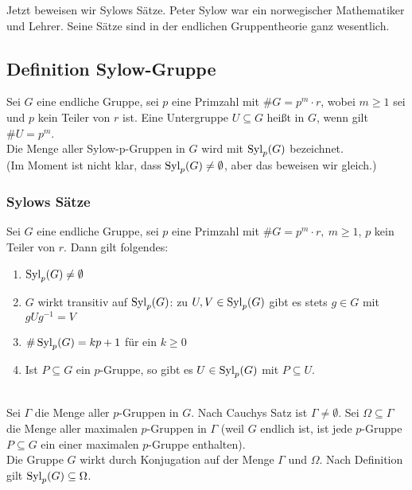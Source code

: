 Jetzt beweisen wir Sylows Sätze. 
Peter Sylow war ein norwegischer Mathematiker und Lehrer. 
Seine Sätze sind in der endlichen Gruppentheorie ganz wesentlich.

\subsection{Definition Sylow-Gruppe}
\label{sub:def_sylow_gruppe}
Sei $G$ eine endliche Gruppe, sei $p$ eine Primzahl mit $\#G=p^m\cdot r$, wobei $m\ge 1$ sei und $p$ kein Teiler von $r$ ist. Eine Untergruppe $U\subseteq G$ heißt  in $G$, wenn gilt $\#U=p^m$.\\
Die Menge aller Sylow-p-Gruppen in $G$ wird mit $\operatorname{Syl}_p(G)$ bezeichnet.\\
(Im Moment ist nicht klar, dass $\operatorname{Syl}_p(G)\not=\emptyset$, aber das beweisen wir gleich.)

\subsubsection*{Sylows Sätze}
\label{ssub:sylows_sätze}
Sei $G$ eine endliche Gruppe, sei $p$ eine Primzahl mit $\#G=p^m\cdot r,~m\ge 1$, $p$ kein Teiler von $r$. 
Dann gilt folgendes:\\
\begin{enumerate}[(1)]
	\item $\operatorname{Syl}_p(G)\not=\emptyset$
	\item $G$ wirkt transitiv auf $\operatorname{Syl}_p(G)$: 
	zu $U,V\in \operatorname{Syl}_p(G)$ gibt es stets $g\in G$ mit $gUg^{-1}=V$
	\item $\#\operatorname{Syl}_p(G)=kp+1$ für ein $k\ge 0$
	\item Ist $P\subseteq G$ ein $p$-Gruppe, so gibt es $U\in \operatorname{Syl}_p(G)$ mit $P\subseteq U$.
\end{enumerate}

\\
Sei $\Gamma$ die Menge aller $p$-Gruppen in $G$. 
Nach Cauchys Satz ist $\Gamma\not=\emptyset$. 
Sei $\Omega\subseteq \Gamma$ die Menge aller maximalen $p$-Gruppen in $\Gamma$ (weil $G$ endlich ist, ist jede $p$-Gruppe $P\subseteq G$ ein einer maximalen $p$-Gruppe enthalten).\\
Die Gruppe $G$ wirkt durch Konjugation auf der Menge $\Gamma$ und $\Omega$. 
Nach Definition gilt $\operatorname{Syl}_p(G)\subseteq \Omega$.\\

